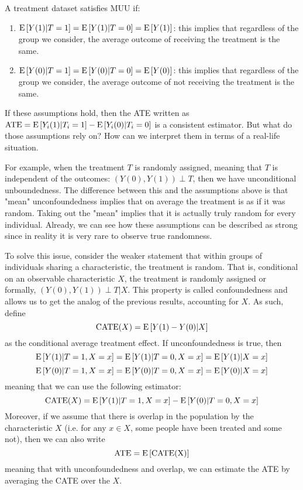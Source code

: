 \begin{definition}
A treatment dataset satisfies MUU if:\begin{enumerate}
\item $\operatorname{E}\left[Y(1)\vert T=1\right] = \operatorname{E}\left[Y(1) \vert T=0\right] = \operatorname{E}\left[Y(1)\right]$: this implies that regardless of the group we consider, the average outcome of receiving the treatment is the same.
\item $\operatorname{E}\left[Y(0)\vert T=1\right] = \operatorname{E}\left[Y(0) \vert T=0\right] = \operatorname{E}\left[Y(0)\right]$: this implies that regardless of the group we consider, the average outcome of not receiving the treatment is the same.
\end{enumerate}
\end{definition}

If these assumptions hold, then the ATE written as $\operatorname{ATE} = \operatorname{E}\left[Y_i(1)\vert T_i=1\right] - \operatorname{E}\left[Y_i(0)\vert T_i=0\right] $ is a consistent estimator. But what do those assumptions rely on? How can we interpret them in terms of a real-life situation.

For example, when the treatment $T$ is randomly assigned, meaning that $T$ is independent of the outcomes: $(Y(0), Y(1)) \perp T $, then we have unconditional unboundedness. The difference between this and the assumptions above is that "mean" unconfoundedness implies that on average the treatment is as if it was random. Taking out the "mean" implies that it is actually truly random for every individual. Already, we can see how these assumptions can be described as strong since in reality it is very rare to observe true randomness.

To solve this issue, consider the weaker statement that within groups of individuals sharing a characteristic, the treatment is random. That is, conditional on an observable characteristic $X$, the treatment is randomly assigned or formally, $(Y(0), Y(1))\perp T \vert X $. This property is called confoundedness and allows us to get the analog of the previous results, accounting for $X$. As such, define $$\operatorname{CATE}(X) = \operatorname{E}\left[Y(1) - Y(0)\vert X\right] $$ as the conditional average treatment effect. If unconfoundedness is true, then $$\operatorname{E}\left[Y(1)\vert T=1,X=x\right] = \operatorname{E}\left[Y(1)\vert T=0,X=x\right] = \operatorname{E}\left[Y(1)\vert X=x\right] $$ $$\operatorname{E}\left[Y(0)\vert T=1,X=x\right] = \operatorname{E}\left[Y(0)\vert T=0,X=x\right] = \operatorname{E}\left[Y(0)\vert X=x\right] $$ meaning that we can use the following estimator: $$\operatorname{CATE}(X) = \operatorname{E}\left[Y(1)\vert T=1,X=x\right] - \operatorname{E}\left[Y(0)\vert T=0,X=x\right] $$ Moreover, if we assume that there is overlap in the population by the characteristic $X$ (i.e. for any $x\in X$, some people have been treated and some not), then we can also write $$\operatorname{ATE} = \operatorname{E}\left[\operatorname{CATE(X)}\right] $$ meaning that with unconfoundedness and overlap, we can estimate the ATE by averaging the CATE over the $X$.

